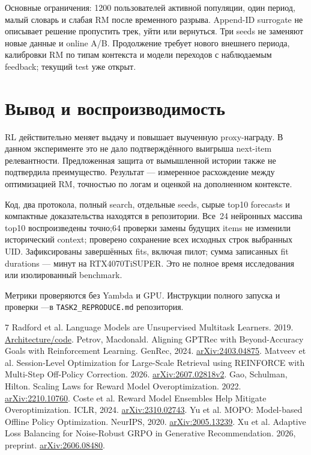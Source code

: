 \documentclass[10pt,a4paper,twocolumn]{article}
\begin{document}
Основные ограничения: 1200 пользователей активной популяции, один период,
малый словарь и слабая RM после временного разрыва. Append-ID surrogate
не описывает решение пропустить трек, уйти или вернуться. Три seeds
не заменяют новые данные и online A/B. Продолжение требует нового
внешнего периода, калибровки RM по типам контекста и модели переходов
с наблюдаемым feedback; текущий test уже открыт.

\section{Вывод и воспроизводимость}

RL действительно меняет выдачу и повышает выученную proxy-награду.
В данном эксперименте это не дало подтверждённого выигрыша next-item
релевантности. Предложенная защита от вымышленной истории также не
подтвердила преимущество. Результат --- измеренное расхождение между
оптимизацией RM, точностью по логам и оценкой на дополненном контексте.

Код, два протокола, полный search, отдельные seeds, сырые top10 forecasts
и компактные доказательства находятся в репозитории.
Все~24 нейронных массива top10 воспроизведены точно;64 проверки
замены будущих items не изменили исторический context;
проверено сохранение всех исходных строк выбранных UID.
Зафиксированы \FitCount{} завершённых fits, включая пилот;
сумма записанных fit durations ---\FitMinutes{} минут на RTX4070TiSUPER.
Это не полное время исследования или изолированный benchmark.

Метрики проверяются без Yambda и GPU. Инструкции полного запуска
и проверки ---в \texttt{TASK2\_REPRODUCE.md} репозитория.

\begin{thebibliography}{7}\scriptsize
\setlength{\itemsep}{1pt}\setlength{\parskip}{0pt}
 Radford et al. Language Models are Unsupervised Multitask Learners. 2019.
\href{https://github.com/openai/gpt-2}{Architecture/code}.
 Petrov, Macdonald. Aligning GPTRec with Beyond-Accuracy Goals with Reinforcement Learning. GenRec, 2024.
\href{https://arxiv.org/abs/2403.04875}{arXiv:2403.04875}.
 Matveev et al. Session-Level Optimization for Large-Scale Retrieval using REINFORCE with Multi-Step Off-Policy Correction. 2026.
\href{https://arxiv.org/abs/2607.02818v2}{arXiv:2607.02818v2}.
 Gao, Schulman, Hilton. Scaling Laws for Reward Model Overoptimization. 2022.
\href{https://arxiv.org/abs/2210.10760}{arXiv:2210.10760}.
 Coste et al. Reward Model Ensembles Help Mitigate Overoptimization. ICLR, 2024.
\href{https://arxiv.org/abs/2310.02743}{arXiv:2310.02743}.
 Yu et al. MOPO: Model-based Offline Policy Optimization. NeurIPS, 2020.
\href{https://arxiv.org/abs/2005.13239}{arXiv:2005.13239}.
 Xu et al. Adaptive Loss Balancing for Noise-Robust GRPO in Generative Recommendation. 2026, preprint.
\href{https://arxiv.org/abs/2606.08480}{arXiv:2606.08480}.
\end{thebibliography}
\end{document}
